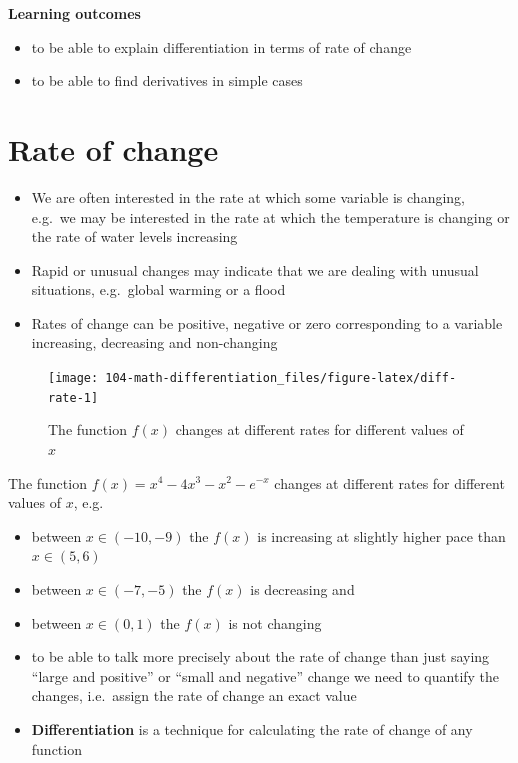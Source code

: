 \documentclass[
]{book}
\providecommand{\tightlist}{%
  \setlength{\itemsep}{0pt}\setlength{\parskip}{0pt}}
\theoremstyle{definition}
\theoremstyle{definition}
\theoremstyle{definition}
\theoremstyle{remark}
\begin{document}
\textbf{Learning outcomes}

\begin{itemize}
\tightlist
\item
  to be able to explain differentiation in terms of rate of change
\item
  to be able to find derivatives in simple cases
\end{itemize}

\hypertarget{rate-of-change}{%
\section{Rate of change}\label{rate-of-change}}

\begin{itemize}
\tightlist
\item
  We are often interested in the rate at which some variable is changing, e.g.~we may be interested in the rate at which the temperature is changing or the rate of water levels increasing
\item
  Rapid or unusual changes may indicate that we are dealing with unusual situations, e.g.~global warming or a flood
\item
  Rates of change can be positive, negative or zero corresponding to a variable increasing, decreasing and non-changing
\end{itemize}

\begin{figure}

{\centering \texttt{[image: 104-math-differentiation\_files/figure-latex/diff-rate-1]} 

}

\caption{The function $f(x)$ changes at different rates for different values of $x$}\label{fig:diff-rate}
\end{figure}

The function \(f(x) = x^4 - 4x^3 - x^2 - e^{-x}\) changes at different rates for different values of \(x\), e.g.~

\begin{itemize}
\tightlist
\item
  between \(x \in (-10, -9)\) the \(f(x)\) is increasing at slightly higher pace than \(x \in (5,6)\)
\item
  between \(x \in (-7, -5)\) the \(f(x)\) is decreasing and
\item
  between \(x \in (0, 1)\) the \(f(x)\) is not changing
\item
  to be able to talk more precisely about the rate of change than just saying ``large and positive'' or ``small and negative'' change we need to quantify the changes, i.e.~assign the rate of change an exact value
\item
  \textbf{Differentiation} is a technique for calculating the rate of change of any function
\end{itemize}
\end{document}
